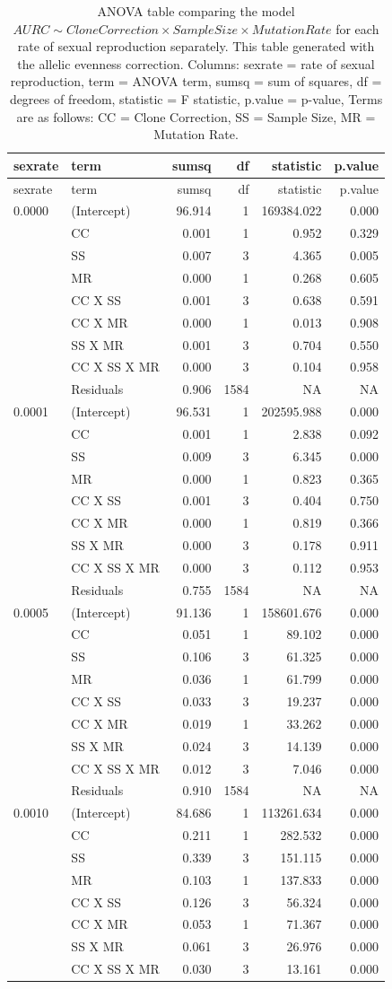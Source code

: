 \documentclass[]{article}
\theoremstyle{definition}
\theoremstyle{definition}
\theoremstyle{remark}
\begin{document}
\begin{longtable}[]{@{}llrrrr@{}}
\caption{\label{tab:sim4} ANOVA table comparing the model
\(AURC \sim Clone Correction \times Sample Size \times Mutation Rate\)
for each rate of sexual reproduction separately. This table generated
with the allelic evenness correction. Columns: sexrate = rate of sexual
reproduction, term = ANOVA term, sumsq = sum of squares, df = degrees of
freedom, statistic = F statistic, p.value = p-value, Terms are as
follows: CC = Clone Correction, SS = Sample Size, MR = Mutation
Rate.}\tabularnewline
\toprule
sexrate & term & sumsq & df & statistic & p.value\tabularnewline
\midrule
\endfirsthead
\toprule
sexrate & term & sumsq & df & statistic & p.value\tabularnewline
\midrule
\endhead
0.0000 & (Intercept) & 96.914 & 1 & 169384.022 & 0.000\tabularnewline
& CC & 0.001 & 1 & 0.952 & 0.329\tabularnewline
& SS & 0.007 & 3 & 4.365 & 0.005\tabularnewline
& MR & 0.000 & 1 & 0.268 & 0.605\tabularnewline
& CC X SS & 0.001 & 3 & 0.638 & 0.591\tabularnewline
& CC X MR & 0.000 & 1 & 0.013 & 0.908\tabularnewline
& SS X MR & 0.001 & 3 & 0.704 & 0.550\tabularnewline
& CC X SS X MR & 0.000 & 3 & 0.104 & 0.958\tabularnewline
& Residuals & 0.906 & 1584 & NA & NA\tabularnewline
0.0001 & (Intercept) & 96.531 & 1 & 202595.988 & 0.000\tabularnewline
& CC & 0.001 & 1 & 2.838 & 0.092\tabularnewline
& SS & 0.009 & 3 & 6.345 & 0.000\tabularnewline
& MR & 0.000 & 1 & 0.823 & 0.365\tabularnewline
& CC X SS & 0.001 & 3 & 0.404 & 0.750\tabularnewline
& CC X MR & 0.000 & 1 & 0.819 & 0.366\tabularnewline
& SS X MR & 0.000 & 3 & 0.178 & 0.911\tabularnewline
& CC X SS X MR & 0.000 & 3 & 0.112 & 0.953\tabularnewline
& Residuals & 0.755 & 1584 & NA & NA\tabularnewline
0.0005 & (Intercept) & 91.136 & 1 & 158601.676 & 0.000\tabularnewline
& CC & 0.051 & 1 & 89.102 & 0.000\tabularnewline
& SS & 0.106 & 3 & 61.325 & 0.000\tabularnewline
& MR & 0.036 & 1 & 61.799 & 0.000\tabularnewline
& CC X SS & 0.033 & 3 & 19.237 & 0.000\tabularnewline
& CC X MR & 0.019 & 1 & 33.262 & 0.000\tabularnewline
& SS X MR & 0.024 & 3 & 14.139 & 0.000\tabularnewline
& CC X SS X MR & 0.012 & 3 & 7.046 & 0.000\tabularnewline
& Residuals & 0.910 & 1584 & NA & NA\tabularnewline
0.0010 & (Intercept) & 84.686 & 1 & 113261.634 & 0.000\tabularnewline
& CC & 0.211 & 1 & 282.532 & 0.000\tabularnewline
& SS & 0.339 & 3 & 151.115 & 0.000\tabularnewline
& MR & 0.103 & 1 & 137.833 & 0.000\tabularnewline
& CC X SS & 0.126 & 3 & 56.324 & 0.000\tabularnewline
& CC X MR & 0.053 & 1 & 71.367 & 0.000\tabularnewline
& SS X MR & 0.061 & 3 & 26.976 & 0.000\tabularnewline
& CC X SS X MR & 0.030 & 3 & 13.161 & 0.000\tabularnewline

\end{longtable}
\end{document}
